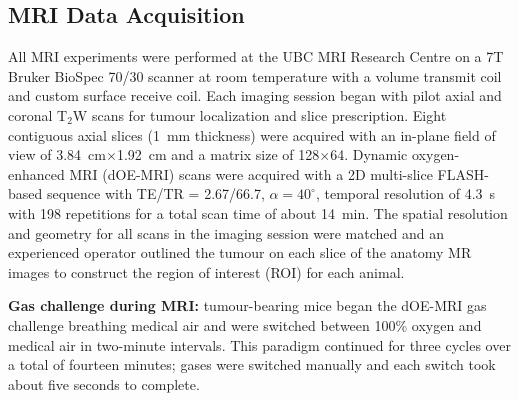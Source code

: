 \subsection{MRI Data Acquisition}
\label{doemri_mrianalysis1}
All MRI experiments were performed at the UBC MRI Research Centre on a 7T Bruker BioSpec 70/30 scanner at room temperature with a volume transmit coil and custom surface receive coil.
Each imaging session began with pilot axial and coronal T$_2$W scans for tumour localization and slice prescription.
Eight contiguous axial slices (1~mm thickness) were acquired with an in-plane field of view of 3.84~cm$\times$1.92~cm and a matrix size of 128$\times$64.
Dynamic oxygen-enhanced MRI (dOE-MRI) scans were acquired with a 2D multi-slice FLASH-based sequence with TE/TR = 2.67/66.7, $\alpha=40^\circ$, temporal resolution of 4.3~s with 198 repetitions for a total scan time of about 14~min.
The spatial resolution and geometry for all scans in the imaging session were matched and an experienced operator outlined the tumour on each slice of the anatomy MR images to construct the region of interest (ROI) for each animal.

\noindent\textbf{Gas challenge during MRI:} tumour-bearing mice began the \acs{dOE-MRI} gas challenge breathing medical air and were switched between 100\% oxygen and medical air in two-minute intervals.
This paradigm continued for three cycles over a total of fourteen minutes; gases were switched manually and each switch took about five seconds to complete.

